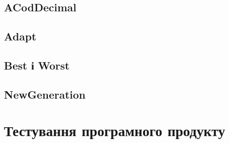 \documentclass[a4paper, 12pt]{article}
\numberwithin{equation}{section}
\begin{document}
\inputminted[firstline=31, lastline=73]{python}{../code/cod_binary.py}

\subsection{ACodDecimal}

\subsection{Adapt}

\subsection{Best і Worst}

\subsection{NewGeneration}

\section{Тестування програмного продукту}

\newpage


\end{document}
